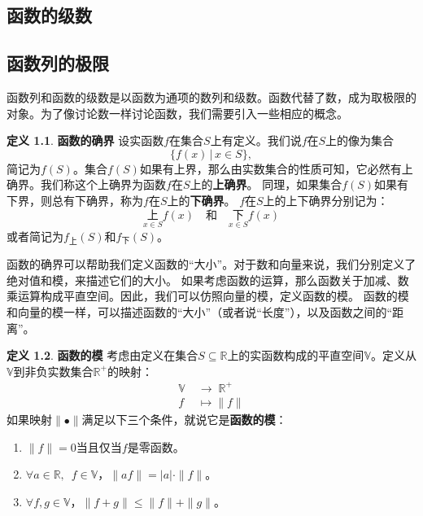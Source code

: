 \documentclass[12pt,UTF8]{ctexbook}
\theoremstyle{definition}
\newtheorem{df}{定义}[section]
\theoremstyle{plain}
\begin{document}
\begin{appendix}

\chapter{函数的级数}

\section{函数列的极限}

函数列和函数的级数是以函数为通项的数列和级数。函数代替了数，成为取极限的对象。为了像讨论数一样讨论函数，我们需要引入一些相应的概念。

\begin{df}{\textbf{函数的确界}}
    设实函数$f$在集合$S$上有定义。我们说$f$在$S$上的像为集合
    $$ \{f(x) \,|\, x\in S\}, $$
    简记为$f(S)$。集合$f(S)$如果有上界，那么由实数集合的性质可知，它必然有上确界。我们称这个上确界为函数$f$在$S$上的\textbf{上确界}。
    同理，如果集合$f(S)$如果有下界，则总有下确界，称为$f$在$S$上的\textbf{下确界}。
    $f$在$S$上的上下确界分别记为：
    $$ \underset{x\in S}{\text{上}} f(x) \quad \mbox{和} \quad \underset{x\in S}{\text{下}} f(x)$$
    或者简记为$f_{\text{上}}(S)$和$f_{\text{下}}(S)$。
\end{df}

函数的确界可以帮助我们定义函数的“大小”。对于数和向量来说，我们分别定义了绝对值和模，来描述它们的大小。
如果考虑函数的运算，那么函数关于加减、数乘运算构成平直空间。因此，我们可以仿照向量的模，定义函数的模。
函数的模和向量的模一样，可以描述函数的“大小”（或者说“长度”），以及函数之间的“距离”。
\begin{df}{\textbf{函数的模}}
    考虑由定义在集合$S\subseteq\mathbb{R}$上的实函数构成的平直空间$\mathbb{V}$。定义从$\mathbb{V}$到非负实数集合$\mathbb{R}^+$的映射：
    \begin{align*}
        \mathbb{V} \; &\rightarrow  \; \mathbb{R}^+ \\
        f &\mapsto \|f\|
    \end{align*}
    如果映射$\|\bullet \|$满足以下三个条件，就说它是\textbf{函数的模}：
    \begin{enumerate}
        \item $\|f\| = 0$当且仅当$f$是零函数。
        \item $\forall a\in\mathbb{R},\,\,\,f \in \mathbb{V}$，$\|af\| = |a| \cdot \|f\|$。
        \item $\forall f,g \in \mathbb{V}$，$\|f + g\| \leqslant \|f\| + \|g\|$。
    \end{enumerate}
\end{df}


\end{appendix}
\end{document}
